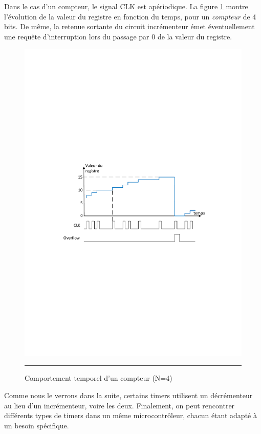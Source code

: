 Dans le cas d'un compteur, le signal CLK est apériodique. La figure \ref{fig:ChronoAsync} montre l'évolution de la valeur du registre en fonction du temps, pour un \textit{compteur} de 4 bits. De même, la retenue sortante du circuit incrémenteur émet éventuellement une requête d'interruption lors du passage par 0 de la valeur du registre.

\begin{figure}[htb]
  \centering
  \includegraphics[angle=0, width=14cm]{./Figures/Chap5_Timer/Timer_chrono2.pdf}
  \rule{35em}{0.5pt}
  \caption[Chrono compteur]{Comportement temporel d'un compteur (N=4)}
  \label{fig:ChronoAsync}
\end{figure}

Comme nous le verrons dans la suite, certains timers utilisent un décrémenteur au lieu d'un incrémenteur, voire les deux.
Finalement, on peut rencontrer différents types de timers dans un même microcontrôleur, chacun étant adapté à un besoin spécifique.

